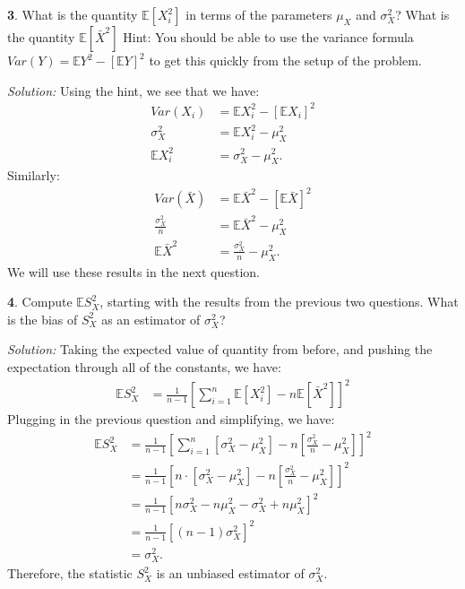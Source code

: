 \documentclass{tufte-handout}
\begin{document}
\textbf{3}. What is the quantity $\mathbb{E}[X_i^2]$ in terms of the parameters $\mu_X$ and
$\sigma_X^2$? What is the quantity $\mathbb{E}[\bar{X}^2]$ Hint: You should be
able to use the variance formula $Var(Y) = \mathbb{E}Y^2 - [\mathbb{E}Y]^2$
to get this quickly from the setup of the problem.

\textit{Solution:} Using the hint, we see that we have:
\begin{align*}
Var(X_i) &= \mathbb{E}X_i^2 - [\mathbb{E}X_i]^2 \\
\sigma_X^2 &= \mathbb{E}X_i^2 - \mu_X^2 \\
\mathbb{E}X_i^2 &= \sigma_X^2 - \mu_X^2.
\end{align*}
Similarly:
\begin{align*}
Var(\bar{X}) &= \mathbb{E}\bar{X}^2 - [\mathbb{E}\bar{X}]^2 \\
\frac{\sigma_X^2}{n}  &= \mathbb{E}\bar{X}^2 - \mu_X^2 \\
\mathbb{E}\bar{X}^2 &= \frac{\sigma_X^2}{n} - \mu_X^2.
\end{align*}
We will use these results in the next question.

\textbf{4}. Compute $\mathbb{E}S_X^2$, starting with the results from the previous two
questions. What is the bias of $S_X^2$ as an estimator of $\sigma_X^2$?

\textit{Solution:} Taking the expected value of quantity from before, and pushing the expectation
through all of the constants, we have:
\begin{align*}
\mathbb{E} S^2_X &= \frac{1}{n-1} \left[ \sum_{i=1}^n \mathbb{E} [X_i^2] - n \mathbb{E}[\bar{X}^2] \right]^2
\end{align*}
Plugging in the previous question and simplifying, we have:
\begin{align*}
\mathbb{E} S^2_X &= \frac{1}{n-1} \left[ \sum_{i=1}^n \left[ \sigma_X^2 - \mu_X^2 \right] -
  n \left[ \frac{\sigma_X^2}{n} - \mu_X^2 \right] \right]^2 \\
&= \frac{1}{n-1} \left[ n \cdot \left[ \sigma_X^2 - \mu_X^2 \right] -
  n \left[ \frac{\sigma_X^2}{n} - \mu_X^2 \right] \right]^2 \\
&= \frac{1}{n-1} \left[ n \sigma_X^2 - n \mu_X^2 - \sigma_X^2 + n \mu_X^2  \right]^2 \\
&= \frac{1}{n-1} \left[ (n-1) \sigma_X^2 \right]^2 \\
&= \sigma_X^2.
\end{align*}
Therefore, the statistic $S_X^2$ is an unbiased estimator of $\sigma_X^2$.
\end{document}
